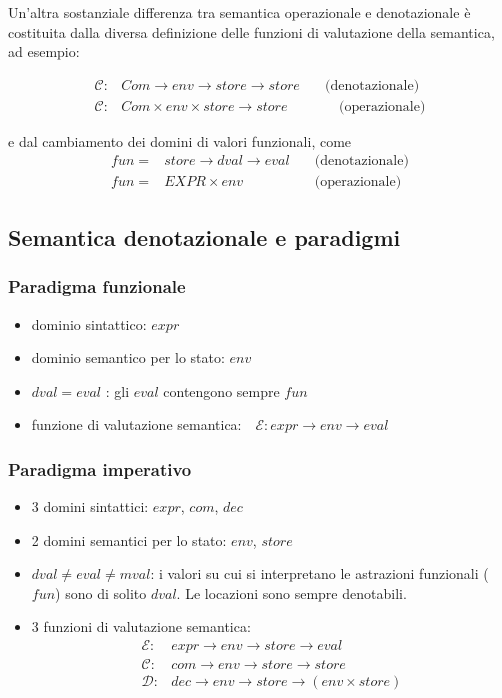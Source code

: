 \documentclass[a4paper, 10pt]{article}
\begin{document}
	\noindent
	Un'altra sostanziale differenza tra semantica operazionale e denotazionale è costituita dalla diversa definizione delle funzioni di valutazione della semantica, ad esempio: 
	
	\begin{align*}
		\mathcal{C}:&Com \to env \to store \to store \quad &\text{(denotazionale)} \\
		\mathcal{C}:&Com \times env \times store \to store &\quad \text{(operazionale)}
	\end{align*}
	
	e dal cambiamento dei domini di valori funzionali, come
	\begin{align*}
		fun =& store \to dval \to eval \quad &\text{(denotazionale)} \\
		fun =& EXPR \times env \quad &\text{(operazionale)}
	\end{align*}
	
	\subsection{Semantica denotazionale e paradigmi}
		\subsubsection{Paradigma funzionale}
			\begin{itemize}
				\item dominio sintattico: $ expr $
				\item dominio semantico per lo stato: $ env $
				\item $ dval = eval $ : gli $ eval $ contengono sempre $ fun $
				\item funzione di valutazione semantica:$\quad \mathcal{E}: expr \to env \to eval$
			\end{itemize}
	
		\subsubsection{Paradigma imperativo}
			\begin{itemize}
				\item 3 domini sintattici: $ expr $, $ com $, $ dec $
				\item 2 domini semantici per lo stato: $ env $, $ store $
				\item $ dval \neq eval \neq mval $: i valori su cui si interpretano le astrazioni funzionali 
				($ fun $) sono di solito $ dval $. Le locazioni sono sempre denotabili.
				\item 3 funzioni di valutazione semantica:
					\begin{align*}
						\mathcal{E}:& expr \to env \to store \to eval  \\
						\mathcal{C}:& com \to env \to store \to store \\
						\mathcal{D}:& dec \to env \to store \to (env \times store)  
					\end{align*}
			\end{itemize}
			
\end{document}
